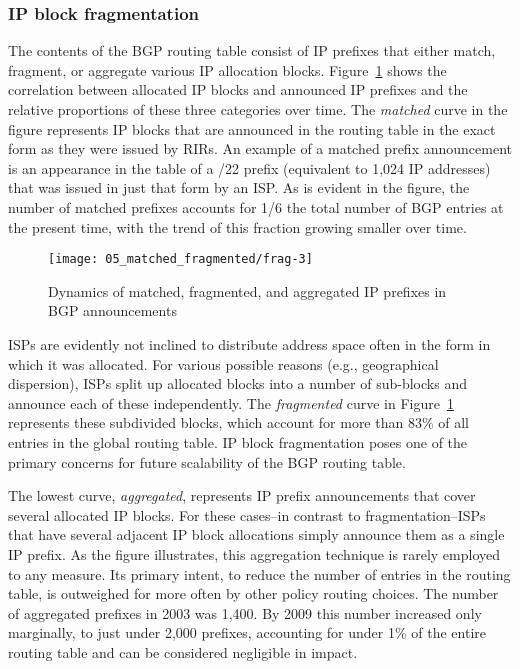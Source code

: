 \subsubsection{IP block fragmentation}

The contents of the BGP routing table consist of IP prefixes that either match,
fragment, or aggregate various IP allocation blocks.
Figure~\ref{fig:fragmentation} shows the correlation between allocated IP
blocks and announced IP prefixes and the relative proportions of these three
categories over time. The \emph{matched} curve in the figure represents IP
blocks that are announced in the routing table in the exact form as they were
issued by RIRs. An example of a matched prefix announcement is an appearance in
the table of a /22 prefix (equivalent to 1,024 IP addresses) that was issued in
just that form by an ISP. As is evident in the figure, the number of matched
prefixes accounts for 1/6 the total number of BGP entries at the present time,
with the trend of this fraction growing smaller over time.

\begin{figure}[htbp]
	\centering
		\texttt{[image: 05\_matched\_fragmented/frag-3]}
	\caption{Dynamics of matched, fragmented, and aggregated IP prefixes in BGP announcements}
	\label{fig:fragmentation}
\end{figure}

ISPs are evidently not inclined to distribute address space often in the form
in which it was allocated. For various possible reasons (e.g., geographical
dispersion), ISPs split up allocated blocks into a number of sub-blocks and
announce each of these independently. The \emph{fragmented} curve in
Figure~\ref{fig:fragmentation} represents these subdivided blocks, which
account for more than 83\% of all entries in the global routing table. IP block
fragmentation poses one of the primary concerns for future scalability of the
BGP routing table.

The lowest curve, \emph{aggregated}, represents IP prefix announcements that
cover several allocated IP blocks. For these cases--in contrast to
fragmentation--ISPs that have several adjacent IP block allocations simply
announce them as a single IP prefix. As the figure illustrates, this
aggregation technique is rarely employed to any measure. Its primary intent,
to reduce the number of entries in the routing table, is outweighed for more
often by other policy routing choices. The number of aggregated prefixes in
2003 was 1,400. By 2009 this number increased only marginally, to just under
2,000 prefixes, accounting for under 1\% of the entire routing table and can
be considered negligible in impact.

